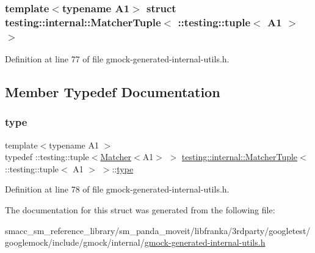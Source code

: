 \subsubsection*{template$<$typename A1$>$\newline
struct testing\+::internal\+::\+Matcher\+Tuple$<$ \+::testing\+::tuple$<$ A1 $>$ $>$}



Definition at line 77 of file gmock-\/generated-\/internal-\/utils.\+h.



\subsection{Member Typedef Documentation}
\mbox{\label{structtesting_1_1internal_1_1MatcherTuple_3_01_1_1testing_1_1tuple_3_01A1_01_4_01_4_a8463ac100366f7e8b6ad1035e42ec4b0}} 
\subsubsection{\texorpdfstring{type}{type}}
{\footnotesize\ttfamily template$<$typename A1 $>$ \\
typedef \+::testing\+::tuple$<$\hyperlink{classtesting_1_1Matcher}{Matcher}$<$A1$>$ $>$ \hyperlink{structtesting_1_1internal_1_1MatcherTuple}{testing\+::internal\+::\+Matcher\+Tuple}$<$ \+::testing\+::tuple$<$ A1 $>$ $>$\+::\hyperlink{structtesting_1_1internal_1_1MatcherTuple_3_01_1_1testing_1_1tuple_3_01A1_01_4_01_4_a8463ac100366f7e8b6ad1035e42ec4b0}{type}}



Definition at line 78 of file gmock-\/generated-\/internal-\/utils.\+h.



The documentation for this struct was generated from the following file\+:\begin{DoxyCompactItemize}
\item 
smacc\+\_\+sm\+\_\+reference\+\_\+library/sm\+\_\+panda\+\_\+moveit/libfranka/3rdparty/googletest/googlemock/include/gmock/internal/\hyperlink{gmock-generated-internal-utils_8h}{gmock-\/generated-\/internal-\/utils.\+h}\end{DoxyCompactItemize}
